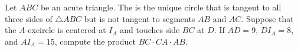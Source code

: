 Let $ABC$ be an acute triangle. The  is the unique circle that is tangent to all three sides of $\triangle{ABC}$ but is not tangent to segments $AB$ and $AC$. Suppose that the $A$-excircle is centered at $I_A$ and touches side $BC$ at $D$. If $AD=9$, $DI_A=8$, and $AI_A=15$, compute the product $BC\cdot CA\cdot AB$.
